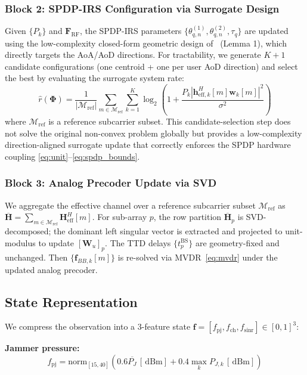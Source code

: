 \documentclass[journal,twocolumn]{IEEEtran}
\newcommand{\vect}[1]{\mathbf{#1}}
\newcommand{\mat}[1]{\mathbf{#1}}
\newcommand{\dBm}{\,\text{dBm}}
\begin{document}
\subsubsection{Block 2: SPDP-IRS Configuration via Surrogate Design}
Given $\{P_k\}$ and $\mat{F}_{\text{RF}}$, the SPDP-IRS parameters $\{\theta_{q,n}^{(1)}, \theta_{q,n}^{(2)}, \tau_q\}$ are updated using the low-complexity closed-form geometric design of~\cite{su2023wideband} (Lemma 1), which directly targets the AoA/AoD directions. For tractability, we generate $K+1$ candidate configurations (one centroid + one per user AoD direction) and select the best by evaluating the surrogate system rate:
\begin{equation}
\hat{r}(\bm{\Phi}) = \frac{1}{|\mathcal{M}_{\text{ref}}|}\sum_{m \in \mathcal{M}_{\text{ref}}} \sum_{k=1}^{K} \log_2\!\left(1 + \frac{P_k|\vect{h}_{\text{eff},k}^H[m]\vect{w}_k[m]|^2}{\sigma^2}\right)
\label{eq:ao_phase}
\end{equation}
where $\mathcal{M}_{\text{ref}}$ is a reference subcarrier subset. This candidate-selection step does not solve the original non-convex problem globally but provides a low-complexity direction-aligned surrogate update that correctly enforces the SPDP hardware coupling \eqref{eq:unit}--\eqref{eq:spdp_bounds}.

\subsubsection{Block 3: Analog Precoder Update via SVD}
We aggregate the effective channel over a reference subcarrier subset $\mathcal{M}_{\text{ref}}$ as $\overline{\mat{H}} = \sum_{m \in \mathcal{M}_{\text{ref}}} \vect{H}_{\text{eff}}^H[m]$. For sub-array $p$, the row partition $\overline{\mat{H}}_p$ is SVD-decomposed; the dominant left singular vector is extracted and projected to unit-modulus to update $[\mat{W}_u]_p$. The TTD delays $\{t_p^{\text{BS}}\}$ are geometry-fixed and unchanged. Then $\{\vect{f}_{BB,k}[m]\}$ is re-solved via MVDR~\eqref{eq:mvdr} under the updated analog precoder.

\subsection{State Representation}

We compress the observation into a 3-feature state $\vect{f} = [f_{\text{pj}}, f_{\text{ch}}, f_{\text{sinr}}] \in [0,1]^3$:

\textbf{Jammer pressure:}
\begin{equation}
f_{\text{pj}} = \text{norm}_{[15,40]}\!\left(0.6\overline{P_J}\,[\dBm] + 0.4\max_k P_{J,k}\,[\dBm]\right)
\end{equation}
\end{document}

